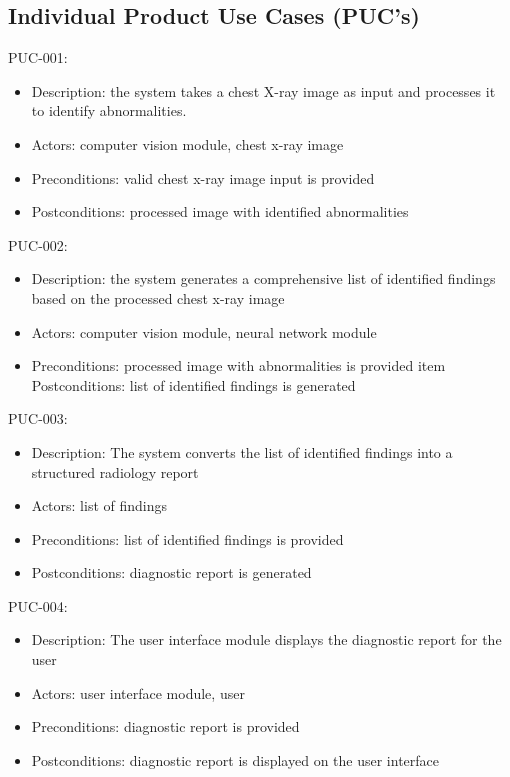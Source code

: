 \documentclass[12pt]{article}
\begin{document}
\subsection{Individual Product Use Cases (PUC's)}
\begin{enumerate}
    \begin{item}
        PUC-001:
        \begin{itemize}
        \item Description: the system takes a chest X-ray image as input and processes it to identify abnormalities.
        \item Actors: computer vision module, chest x-ray image
        \item Preconditions: valid chest x-ray image input is provided
        \item Postconditions: processed image with identified abnormalities
        \end{itemize}
    \end{item}
    \begin{item}
        PUC-002:
        \begin{itemize}
            \item Description: the system generates a comprehensive list of identified findings based on the processed chest x-ray image
            \item Actors: computer vision module, neural network module 
            \item Preconditions: processed image with abnormalities is provided
            item Postconditions: list of identified findings is generated 
        \end{itemize}
    \end{item}
    \begin{item}
        PUC-003:
        \begin{itemize}
            \item Description: The system converts the list of identified findings into a structured radiology report 
            \item Actors: list of findings
            \item Preconditions: list of identified findings is provided
            \item Postconditions: diagnostic report is generated
        \end{itemize}
    \end{item}
    \begin{item}
        PUC-004:
        \begin{itemize}
            \item Description: The user interface module displays the diagnostic report for the user
            \item Actors: user interface module, user
            \item Preconditions: diagnostic report is provided
            \item Postconditions: diagnostic report is displayed on the user interface
        \end{itemize}
    \end{item}
\end{enumerate}
\end{document}
